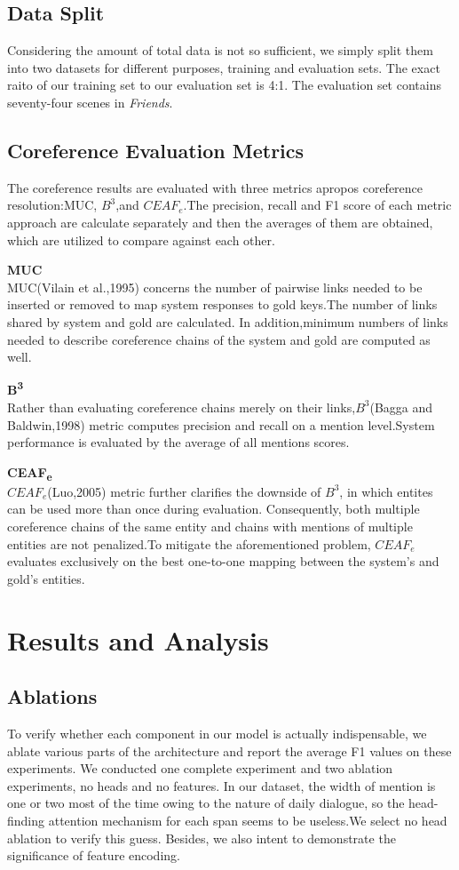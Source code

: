 \documentclass[11pt]{article}
\begin{document}
\subsection{Data Split}
Considering the amount of total data is not so sufficient, we simply split them into two datasets for different purposes, training and evaluation sets. The exact raito of our training set to our evaluation set is 4:1. The evaluation set contains seventy-four scenes in \textit{Friends}.

\subsection{Coreference Evaluation Metrics}
The coreference results are evaluated with three metrics apropos coreference resolution:MUC, $B^{3}$,and $CEAF_e$.The precision, recall and F1 score of each metric approach are calculate separately and then the averages of them are obtained, which are utilized to compare against each other.

\textbf{MUC}\\
MUC(Vilain et al.,1995) concerns the number of pairwise links needed to be inserted or removed to map system responses to gold keys.The number of links shared by  system and gold are calculated. In addition,minimum numbers of links needed to describe coreference chains of the system and gold are computed as well.

\textbf{B\textsuperscript{3}} \\
Rather than evaluating coreference chains merely on their links,$B^{3}$(Bagga and Baldwin,1998) metric computes precision and recall on a mention level.System performance is evaluated by the average of all mentions scores.


\textbf{CEAF\textsubscript{e}} \\
$CEAF_e$(Luo,2005) metric further clarifies the downside of $B^{3}$, in which entites can be used more than once during evaluation. Consequently, both multiple coreference chains of the same entity and chains with mentions of multiple entities are not penalized.To mitigate the aforementioned problem, $CEAF_e$ evaluates exclusively on the best one-to-one mapping between the system’s and gold’s entities.


\section{Results and Analysis}
\subsection{Ablations}
To verify whether each component in our model is actually indispensable, we ablate various parts of the architecture and report the average F1 values on these experiments. We conducted one complete experiment and two ablation experiments, no heads and no features. In our dataset, the width of mention is one or two most of the time owing to the nature of daily dialogue, so the head-finding attention mechanism for each span seems to be useless.We select no head ablation to verify this guess. Besides, we also intent to demonstrate the significance of feature encoding.
\end{document}
